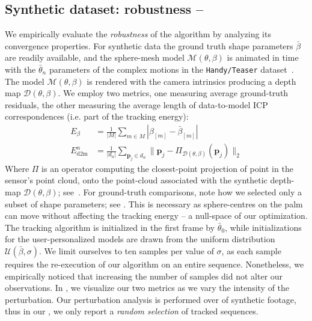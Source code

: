 \subsection{Synthetic dataset: robustness -- }
\label{sec:evalsynth}
We empirically evaluate the \emph{robustness} of the algorithm by analyzing its convergence properties. 
For synthetic data the ground truth shape parameters $\bar\beta$ are readily available, and the sphere-mesh model $\mathcal{M}(\theta,\beta)$ is animated in time with the $\bar\theta_n$ parameters of the complex motions in the \texttt{Handy/Teaser} dataset~\cite{tkach2016sphere}.
The model $\mathcal{M}(\theta,\beta)$ is rendered with the camera intrinsics producing a depth map $\mathcal{D}(\theta,\beta)$. We employ two metrics, one measuring average ground-truth residuals, the other measuring the average length of data-to-model ICP correspondences (i.e. part of the tracking energy):
% 
\begin{align}
E_{\beta} &= \tfrac{1}{|M|} \sum_{m \in M} \left| \beta_{[m]} - \bar\beta_{[m]} \right|
\\
E_\text{d2m}^n &= \tfrac{1}{|d_n|} \sum_{\mathbf{p}_j \in d_n} \| \mathbf{p}_j - \Pi_{\mathcal{D}(\theta,\beta)}(\mathbf{p}_j) \|_2
\label{eq:metrics}
\end{align}
% 
Where $\Pi$ is an operator computing the closest-point projection of point in the sensor's point cloud, onto the point-cloud associated with the synthetic depth-map $\mathcal{D}(\theta,\beta)$; see~\cite{tkach2016sphere}. For ground-truth comparisons, note how we selected only a subset  of shape parameters; see . This is necessary as sphere-centres on the palm can move without affecting the tracking energy -- a null-space of our optimization.
% 
The tracking algorithm is initialized in the first frame by $\bar\theta_0$, while initializations for the user-personalized models are drawn from the uniform distribution {\small $\mathcal{U}(\bar\beta, \sigma)$}.
We limit ourselves to ten samples per value of $\sigma$, as each sample requires the re-execution of our algorithm on an entire sequence. Nonetheless, we empirically noticed that increasing the number of samples did not alter our observations.
In , we visualize our two metrics as we vary the intensity of the perturbation. Our perturbation analysis is performed over  of synthetic footage, thus in our \VideoSynth{}, we only report a \emph{random selection} of tracked sequences.
% 


